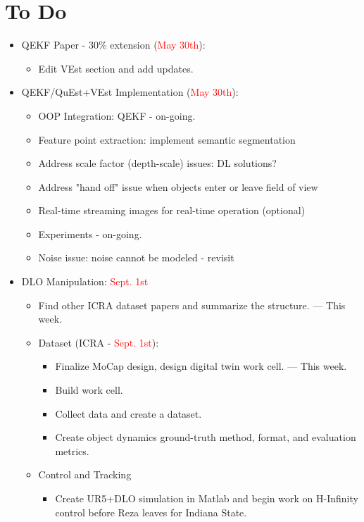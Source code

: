 \documentclass[11pt]{article}
\begin{document}
\section{To Do}
\begin{itemize}
  \item QEKF Paper - 30\% extension (\textcolor{red}{May 30th}):
  \begin{itemize}
      \item Edit VEst section and add updates.
  \end{itemize}
  \item QEKF/QuEst+VEst Implementation (\textcolor{red}{May 30th}):
  \begin{itemize}
      \item OOP Integration: QEKF - on-going.
      \item Feature point extraction: implement semantic segmentation
      \item Address scale factor (depth-scale) issues: DL solutions?
      \item Address "hand off" issue when objects enter or leave field of view
      \item Real-time streaming images for real-time operation (optional)
      \item Experiments - on-going.
      \item Noise issue: noise cannot be modeled - revisit
  \end{itemize}
  \item  DLO Manipulation:  \textcolor{red}{Sept. 1st}
  \begin{itemize}
      \item Find other ICRA dataset papers and summarize the structure. --- This week.
      \item Dataset (ICRA -  \textcolor{red}{Sept. 1st}):
      \begin{itemize}
            \item Finalize MoCap design, design digital twin work cell. --- This week.
            \item Build work cell.
            \item Collect data and create a dataset.
            \item Create object dynamics ground-truth method, format, and evaluation
            metrics.
      \end{itemize}
      \item Control and Tracking
      \begin{itemize}
            \item Create UR5+DLO simulation in Matlab and begin work on H-Infinity control before Reza leaves for Indiana State.

\end{itemize}
\end{itemize}
\end{itemize}
\end{document}
